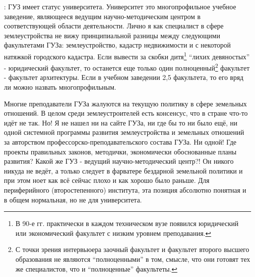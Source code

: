 \begin{drama}
	\maxspeaks: ГУЗ имеет статус университета. Университет это многопрофильное учебное заведение, являющееся ведущим научно-методическим центром в соответствующей области деятельности. 
Лично я как специалист в сфере землеустройства не вижу принципиальной разницы между следующими факультетами ГУЗа: землеустройство, кадастр недвижимости и с некоторой натяжкой городского кадастра. Если вывести за скобки дитя\footnote{В 90-е гг. практически в каждом техническом вузе появился юридический или экономический факультет с низким уровнем преподавания.} “лихих девяностых” - юридический факультет, то останется еще только один полноценный\footnote{С точки зрения интервьюера заочный факультет и факультет второго высшего образования не являются “полноценными” в том, смысле, что они готовят тех же специалистов, что и “полноценные” факультеты.} факультет - факультет архитектуры. Если в учебном заведении 2,5 факультета, то его вряд ли можно назвать многопрофильным. 

Многие преподаватели ГУЗа жалуются на текущую политику в сфере земельных отношений. В целом среди землеустроителей есть консенсус, что в стране что-то идёт не так. Но! Я не нашел ни на сайте ГУЗа, ни где бы то ни было ещё, ни одной системной программы развития землеустройства и земельных отношений за авторством профессорско-преподавательского состава ГУЗа. Ни одной! Где проекты правильных законов, методички, экономически обоснованные планы развития? Какой же ГУЗ - ведущий научно-методический центр?! Он никого никуда не ведёт, а только следует в фарватере бездарной земельной политики и при этом ноет как всё сейчас плохо и как хорошо было раньше. Для периферийного (второстепенного) института, эта позиция абсолютно понятная и в общем нормальная, но не для университета. 


\end{drama}
